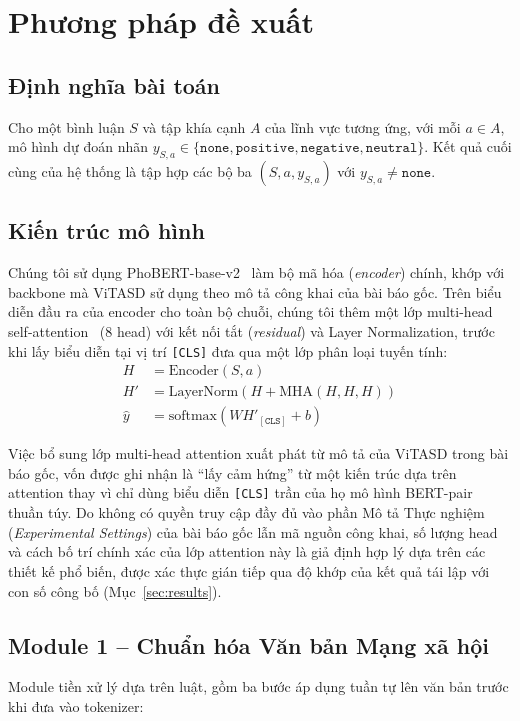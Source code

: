 \documentclass[11pt]{article}
\begin{document}
\section{Phương pháp đề xuất}
\label{sec:method}

\subsection{Định nghĩa bài toán}
Cho một bình luận $S$ và tập khía cạnh $A$ của lĩnh vực tương ứng, với mỗi $a \in A$, mô hình dự đoán nhãn $y_{S,a} \in \{\texttt{none}, \texttt{positive}, \texttt{negative}, \texttt{neutral}\}$. Kết quả cuối cùng của hệ thống là tập hợp các bộ ba $(S, a, y_{S,a})$ với $y_{S,a} \neq \texttt{none}$.

\subsection{Kiến trúc mô hình}
Chúng tôi sử dụng PhoBERT-base-v2~\citep{nguyen2020phobert} làm bộ mã hóa (\textit{encoder}) chính, khớp với backbone mà ViTASD sử dụng theo mô tả công khai của bài báo gốc. Trên biểu diễn đầu ra của encoder cho toàn bộ chuỗi, chúng tôi thêm một lớp multi-head self-attention~\citep{vaswani2017attention} (8 head) với kết nối tắt (\textit{residual}) và Layer Normalization, trước khi lấy biểu diễn tại vị trí \texttt{[CLS]} đưa qua một lớp phân loại tuyến tính:
\begin{align}
    H &= \text{Encoder}(S, a) \\
    H' &= \text{LayerNorm}(H + \text{MHA}(H,H,H)) \\
    \hat{y} &= \text{softmax}(W H'_{[\texttt{CLS}]} + b)
\end{align}

Việc bổ sung lớp multi-head attention xuất phát từ mô tả của ViTASD trong bài báo gốc, vốn được ghi nhận là ``lấy cảm hứng'' từ một kiến trúc dựa trên attention thay vì chỉ dùng biểu diễn \texttt{[CLS]} trần của họ mô hình BERT-pair thuần túy. Do không có quyền truy cập đầy đủ vào phần Mô tả Thực nghiệm (\textit{Experimental Settings}) của bài báo gốc lẫn mã nguồn công khai, số lượng head và cách bố trí chính xác của lớp attention này là giả định hợp lý dựa trên các thiết kế phổ biến, được xác thực gián tiếp qua độ khớp của kết quả tái lập với con số công bố (Mục~\ref{sec:results}).

\subsection{Module 1 -- Chuẩn hóa Văn bản Mạng xã hội}
\label{sec:module1}
Module tiền xử lý dựa trên luật, gồm ba bước áp dụng tuần tự lên văn bản trước khi đưa vào tokenizer:
\end{document}
